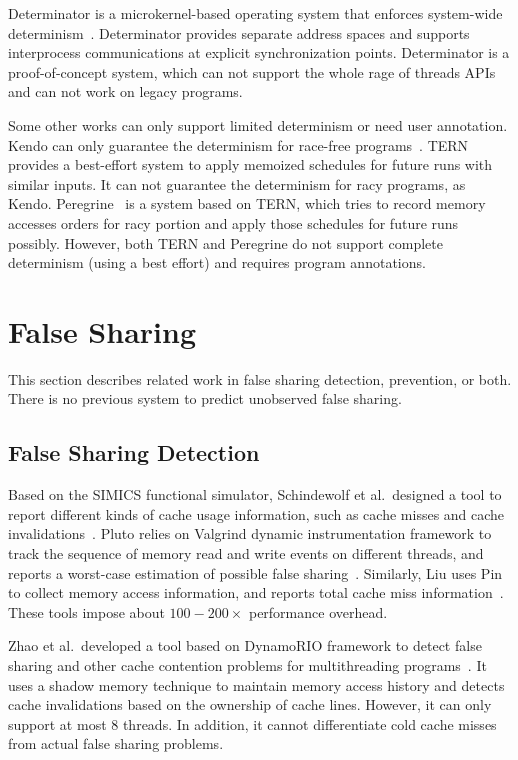 Determinator is a microkernel-based operating system that enforces system-wide determinism~\cite{efficient-system-enforced}. Determinator provides separate address spaces and supports interprocess
communications at explicit synchronization points. 
Determinator is a proof-of-concept system, which can not support the whole rage of
threads APIs and can not work on legacy programs.  

Some other works can only support limited determinism or need user annotation.
Kendo can only guarantee the determinism for race-free programs~\cite{1508256}. 
TERN~\cite{stable-deterministic} provides a best-effort system to 
apply memoized schedules for future runs with similar inputs. 
It can not guarantee the determinism for racy programs, as Kendo. 
Peregrine~\cite{peregrine:sosp11} is a system based on TERN, which tries to record
 memory accesses orders for racy portion and apply those schedules for future runs possibly.
However, both TERN and Peregrine do not support complete determinism (using a best effort)
and requires program annotations. 

\section{False Sharing}

This section describes related work in false sharing detection, prevention, or both. There is no previous
system to predict unobserved false sharing.

\subsection{False Sharing Detection}
Based on the SIMICS functional simulator, Schindewolf et al.\ designed a tool to report different kinds of cache usage information, such as cache misses and cache invalidations~\cite{falseshare:simulator}. Pluto relies on Valgrind dynamic instrumentation framework to track the sequence of memory read and write events on different threads, and reports a worst-case estimation of possible false sharing~\cite{falseshare:binaryinstrumentation1}.
Similarly, Liu uses Pin to collect memory access information, and reports total cache miss information~\cite{falseshare:binaryinstrumentation2}.
These tools impose about $100-200\times$ performance overhead.

Zhao et al.\ developed a tool based on DynamoRIO framework to detect false sharing and other cache contention problems
for multithreading programs~\cite{qinzhao}. 
It uses a shadow memory technique to maintain memory access history and detects cache invalidations based on the ownership of cache lines. However, it can only support at most $8$ threads. In addition, it cannot differentiate cold cache misses from actual false sharing problems.

